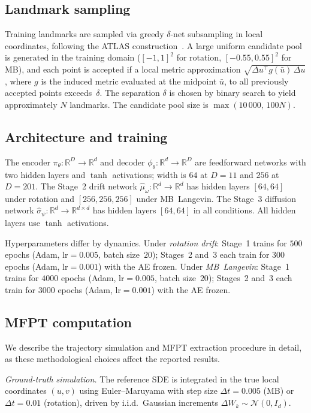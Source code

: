 \documentclass[11pt]{article}
\newcommand{\R}{\mathbb{R}}
\begin{document}
\subsection{Landmark sampling}\label{app:landmarks}

Training landmarks are sampled via greedy $\delta$-net subsampling
in local coordinates, following the ATLAS
construction~\cite{Miles17}.
A large uniform candidate pool is generated in the training
domain ($[-1,1]^2$ for rotation, $[-0.55,0.55]^2$ for MB),
and each point is accepted if a local metric approximation
$\sqrt{\Delta u^\top g(\bar u)\,\Delta u}$, where $g$ is
the induced metric evaluated at the midpoint $\bar u$,
to all previously accepted points exceeds~$\delta$.
The separation $\delta$ is chosen by binary search to yield
approximately $N$ landmarks.
The candidate pool size is $\max(10\,000,\,100N)$.

\subsection{Architecture and training}\label{app:architecture}

The encoder $\pi_\theta:\R^D\to\R^d$ and decoder $\phi_\theta:\R^d\to\R^D$
are feedforward networks with two hidden layers and $\tanh$ activations;
width is $64$ at $D{=}11$ and $256$ at $D{=}201$.
The Stage~2 drift network $\hat\mu_\omega:\R^d\to\R^d$ has hidden
layers $[64,64]$ under rotation and $[256,256,256]$ under MB~Langevin.
The Stage~3 diffusion network $\hat\sigma_\psi:\R^d\to\R^{d\times d}$
has hidden layers $[64,64]$ in all conditions.
All hidden layers use $\tanh$ activations.

Hyperparameters differ by dynamics.
Under \emph{rotation drift}: Stage~1 trains for $500$ epochs
(Adam, lr${}=0.005$, batch size~$20$);
Stages~2 and~3 each train for $300$ epochs (Adam, lr${}=0.001$)
with the AE frozen.
Under \emph{MB~Langevin}: Stage~1 trains for $4000$ epochs
(Adam, lr${}=0.005$, batch size~$20$);
Stages~2 and~3 each train for $3000$ epochs (Adam, lr${}=0.001$)
with the AE frozen.

\subsection{MFPT computation}\label{app:mfpt}

We describe the trajectory simulation and MFPT extraction procedure
in detail, as these methodological choices affect the reported results.

\emph{Ground-truth simulation.}
The reference SDE is integrated in the true local coordinates
$(u,v)$ using Euler--Maruyama with step size $\Delta t = 0.005$
(MB) or $\Delta t = 0.01$ (rotation), driven by i.i.d.\ Gaussian
increments $\Delta W_k\sim\mathcal{N}(0,I_d)$.
\end{document}
